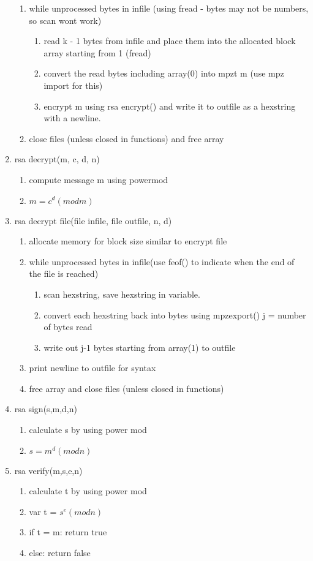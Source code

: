 \documentclass[11pt]{article}
\begin{document}
\begin{enumerate}
\begin{enumerate}
	\item while unprocessed bytes in infile (using fread - bytes may not be numbers, so scan wont work)
		\begin{enumerate}
		\item read k - 1 bytes from infile and place them into the allocated block array starting from 1 (fread)
		\item convert the read bytes including array(0) into mpzt m (use mpz import for this)
		\item encrypt m using rsa encrypt() and write it to outfile as a hexstring with a newline. 
		\end{enumerate}
	\item close files (unless closed in functions) and free array
	\end{enumerate}
\item rsa decrypt(m, c, d, n)
	\begin{enumerate}
	\item compute message m using powermod
	\item \(m = c^d (mod m)\)
	\end{enumerate}
\item rsa decrypt file(file infile, file outfile, n, d)
	\begin{enumerate}
	\item allocate memory for block size similar to encrypt file
	\item while unprocessed bytes in infile(use feof() to indicate when the end of the file is reached)
		\begin{enumerate}
		\item scan hexstring, save hexstring in variable.
		\item convert each hexstring back into bytes using mpzexport() j = number of bytes read 
		\item write out j-1 bytes starting from array(1) to outfile
		\end{enumerate}
	\item print newline to outfile for syntax
	\item free array and close files (unless closed in functions)
	\end{enumerate}
\item rsa sign(s,m,d,n)
	\begin{enumerate}
	\item calculate s by using power mod
	\item \(s = m^d (mod n)\)
	\end{enumerate}
\item rsa verify(m,s,e,n)
	\begin{enumerate}
	\item calculate t by using power mod
	\item var t = \(s^e (mod n)\)
	\item if t = m: return true
	\item else: return false
	\end{enumerate}


\end{enumerate}
\end{document}
